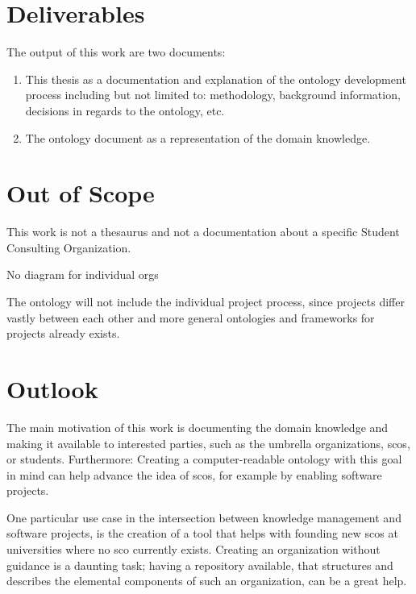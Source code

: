 \documentclass[a4paper, DIV=13, BCOR=0cm]{scrbook}
\begin{document}
\section{Deliverables }
The output of this work are two documents:
\begin{enumerate}
	\item This thesis as a documentation and explanation of the ontology development process including but not limited to: methodology, background information, decisions in regards to the ontology, etc.
	\item The ontology document as a representation of the domain knowledge.
\end{enumerate}

\section{Out of Scope }
\begin{compactenum}
	\item This work is not a thesaurus and not a documentation about a specific Student Consulting Organization.
	\item No diagram for individual orgs
	\item The ontology will not include the individual project process, since projects differ vastly between each other and more general ontologies and frameworks for projects already exists.
\end{compactenum}

\section{Outlook }
The main motivation of this work is documenting the domain knowledge and making it available to interested parties, such as the umbrella organizations, \glspl{sco}, or students. Furthermore: Creating a computer-readable ontology with this goal in mind can help advance the idea of \glspl{sco}, for example by enabling software projects.


One particular use case in the intersection between knowledge management and software projects, is the creation of a tool that helps with founding new \glspl{sco} at universities where no \gls{sco} currently exists. Creating an organization without guidance is a daunting task; having a repository available, that structures and describes the elemental components of such an organization, can be a great help.
\end{document}

